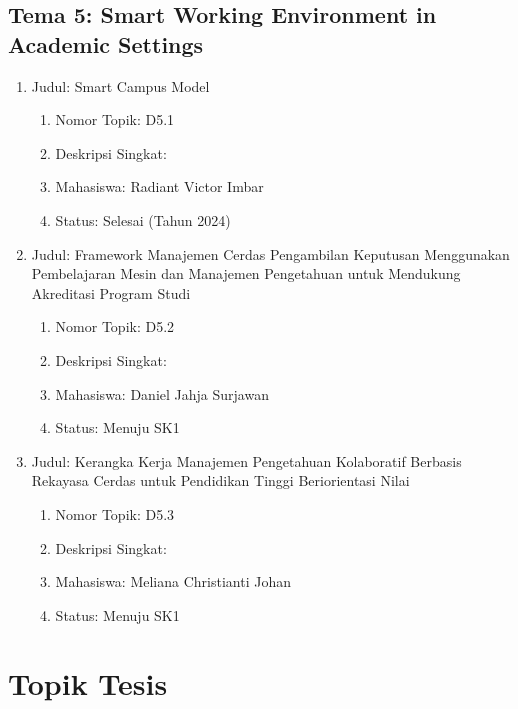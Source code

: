 \documentclass[
  letterpaper,
  DIV=11,
  numbers=noendperiod]{scrreprt}
\providecommand{\tightlist}{%
  \setlength{\itemsep}{0pt}\setlength{\parskip}{0pt}}
\begin{document}
\section{Tema 5: Smart Working Environment in Academic
Settings}\label{tema-5-smart-working-environment-in-academic-settings}

\begin{enumerate}
\def\labelenumi{\arabic{enumi}.}
\tightlist
\item
  Judul: Smart Campus Model

  \begin{enumerate}
  \def\labelenumii{\arabic{enumii}.}
  \tightlist
  \item
    Nomor Topik: D5.1
  \item
    Deskripsi Singkat:
  \item
    Mahasiswa: Radiant Victor Imbar
  \item
    Status: Selesai (Tahun 2024)
  \end{enumerate}
\item
  Judul: Framework Manajemen Cerdas Pengambilan Keputusan Menggunakan
  Pembelajaran Mesin dan Manajemen Pengetahuan untuk Mendukung
  Akreditasi Program Studi

  \begin{enumerate}
  \def\labelenumii{\arabic{enumii}.}
  \tightlist
  \item
    Nomor Topik: D5.2
  \item
    Deskripsi Singkat:
  \item
    Mahasiswa: Daniel Jahja Surjawan
  \item
    Status: Menuju SK1
  \end{enumerate}
\item
  Judul: Kerangka Kerja Manajemen Pengetahuan Kolaboratif Berbasis
  Rekayasa Cerdas untuk Pendidikan Tinggi Beriorientasi Nilai

  \begin{enumerate}
  \def\labelenumii{\arabic{enumii}.}
  \tightlist
  \item
    Nomor Topik: D5.3
  \item
    Deskripsi Singkat:
  \item
    Mahasiswa: Meliana Christianti Johan
  \item
    Status: Menuju SK1
  \end{enumerate}
\end{enumerate}


\chapter{Topik Tesis}\label{topik-tesis}
\end{document}
